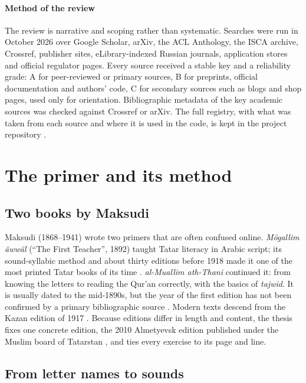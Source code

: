 \documentclass[a4paper,14pt]{extarticle}
\begin{document}
\paragraph{Method of the review} The review is narrative and scoping rather than systematic. Searches
were run in October 2026 over Google Scholar, arXiv, the ACL Anthology, the ISCA archive, Crossref,
publisher sites, eLibrary-indexed Russian journals, application stores and official regulator pages.
Every source received a stable key and a reliability grade: A for peer-reviewed or primary sources, B
for preprints, official documentation and authors' code, C for secondary sources such as blogs and
shop pages, used only for orientation. Bibliographic metadata of the key academic sources was checked
against Crossref or arXiv. The full registry, with what was taken from each source and where it is used
in the code, is kept in the project repository \cite{SRC-038}.

\section{The primer and its method}

\subsection{Two books by Maksudi}

Maksudi (1868--1941) wrote two primers that are often confused online. \emph{Mögallim äwwäl} (``The First
Teacher'', 1892) taught Tatar literacy in Arabic script; its sound-syllabic method and about thirty
editions before 1918 made it one of the most printed Tatar books of its time \cite{SRC-015,SRC-019}.
\emph{al-Muallim ath-Thani} continued it: from knowing the letters to reading the Qur'an correctly, with the
basics of \emph{tajwid}. It is usually dated to the mid-1890s, but the year of the first edition has not
been confirmed by a primary bibliographic source \cite{SRC-018}. Modern texts descend from the Kazan
edition of 1917 \cite{SRC-024}. Because editions differ in length and content, the thesis fixes one
concrete edition, the 2010 Almetyevsk edition published under the Muslim board of Tatarstan
\cite{SRC-040}, and ties every exercise to its page and line.

\subsection{From letter names to sounds}
\end{document}

